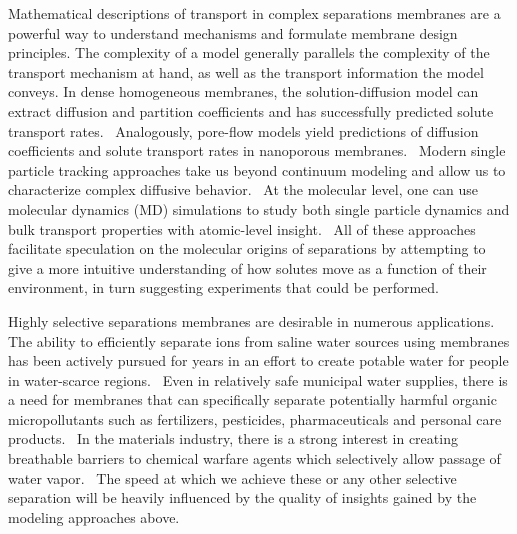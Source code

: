 \documentclass{article}
\begin{document}
  Mathematical descriptions of transport in complex separations membranes are 
  a powerful way to understand mechanisms and formulate membrane design principles. 
  \cite{vinh-thang_predictive_2013,geens_transport_2006,darvishmanesh_mass_2016}
  The complexity of a model generally parallels the complexity of the transport 
  mechanism at hand, as well as the transport information the model conveys.
  In dense homogeneous membranes, the solution-diffusion model can extract 
  diffusion and partition coefficients and has successfully predicted solute 
  transport rates.~\cite{wijmans_solution-diffusion_1995} Analogously, pore-flow
  models yield predictions of diffusion coefficients and solute transport rates 
  in nanoporous membranes.~\cite{paul_diffusive_1974} Modern single particle 
  tracking approaches take us beyond continuum modeling and allow us to 
  characterize complex diffusive behavior.~\cite{manzo_review_2015} At the molecular
  level, one can use molecular dynamics (MD) simulations to study both single 
  particle dynamics and bulk transport properties with atomic-level insight.~\cite{coscia_chemically_2019,maginn_best_2018}
  All of these approaches facilitate speculation on the molecular origins of separations
  by attempting to give a more intuitive understanding of how solutes move as a function
  of their environment, in turn suggesting experiments that could be performed.
  
  Highly selective separations membranes are desirable in numerous applications. 
  The ability to efficiently separate ions from saline water sources using membranes 
  has been actively pursued for years in an effort to create potable water for people 
  in water-scarce regions.~\cite{werber_materials_2016} Even in relatively safe
  municipal water supplies, there is a need for membranes that can specifically separate
  potentially harmful organic micropollutants such as fertilizers, pesticides, pharmaceuticals
  and personal care products.~\cite{barbosa_occurrence_2016} In the materials industry,
  there is a strong interest in creating breathable barriers to chemical warfare agents
  which selectively allow passage of water vapor.~\cite{mondloch_destruction_2015}
  The speed at which we achieve these or any other selective separation will be 
  heavily influenced by the quality of insights gained by the modeling approaches above.
\end{document}

